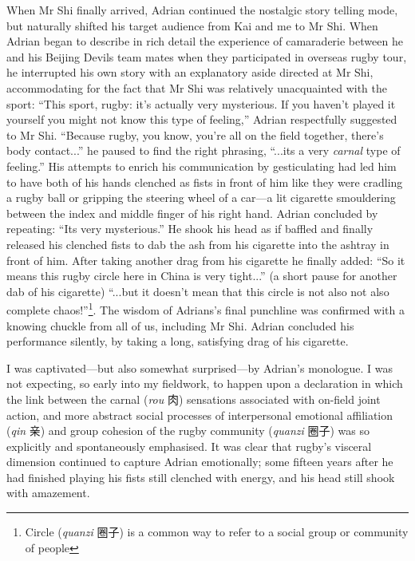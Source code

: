 \begin{CJK}{UTF8}{gbsn}
When Mr Shi finally arrived, Adrian continued the nostalgic story telling mode, but naturally shifted his target audience from Kai and me to Mr Shi.  When Adrian began to describe in rich detail the experience of camaraderie between he and his Beijing Devils team mates when they participated in overseas rugby tour, he interrupted his own story with an explanatory aside directed at Mr Shi, accommodating for the fact that Mr Shi was relatively unacquainted with the sport: ``This sport, rugby: it's actually very mysterious. If you haven't played it yourself you might not know this type of feeling,'' Adrian respectfully suggested to Mr Shi.  ``Because rugby, you know, you're all on the field together, there's body contact...'' he paused to find the right phrasing,  ``...its a very \textit{carnal} type of feeling.''  His attempts to enrich his communication by gesticulating had led him to have both of his hands clenched as fists in front of him like they were cradling a rugby ball or gripping the steering wheel of a car---a lit cigarette smouldering between the index and middle finger of his right hand.  Adrian concluded by repeating: ``Its very mysterious.'' He shook his head as if baffled and finally released his clenched fists to dab the ash from his cigarette into the ashtray in front of him.  After taking another drag from his cigarette he finally added: ``So it means this rugby circle here in China is very tight...'' (a short pause for another dab of his cigarette) ``...but it doesn't mean that this circle is not also not also complete chaos!''\footnote{Circle (\textit{quanzi} 圈子) is a common way to refer to a social group or community of people}.  The wisdom of Adrians's final punchline was confirmed with a knowing chuckle from all of us, including Mr Shi. Adrian concluded his performance silently, by taking a long, satisfying drag of his cigarette.


I was captivated---but also somewhat surprised---by Adrian's monologue.  I was not expecting, so early into my fieldwork, to happen upon a declaration in which the link between the carnal (\textit{rou} 肉) sensations associated with on-field joint action, and more abstract social processes of interpersonal emotional affiliation (\textit{qin} 亲) and group cohesion of the rugby community (\textit{quanzi} 圈子) was so explicitly and spontaneously emphasised.  It was clear that rugby's visceral dimension continued to capture Adrian emotionally; some fifteen years after he had finished playing his fists still clenched with energy, and his head still shook with amazement.


\end{CJK}
